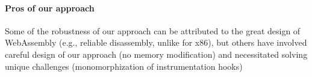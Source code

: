 \documentclass[sigplan,review,anonymous]{acmart}\settopmatter{printfolios=true,printccs=false,printacmref=false}
\begin{document}






%
%
%

\paragraph{Pros of our approach}
Some of the robustness of our approach can be attributed to the great design of WebAssembly (e.g., reliable disassembly, unlike for x86), but others have involved careful design of our approach (no memory modification) and necessitated solving unique challenges (monomorphization of instrumentation hooks)
\end{document}
